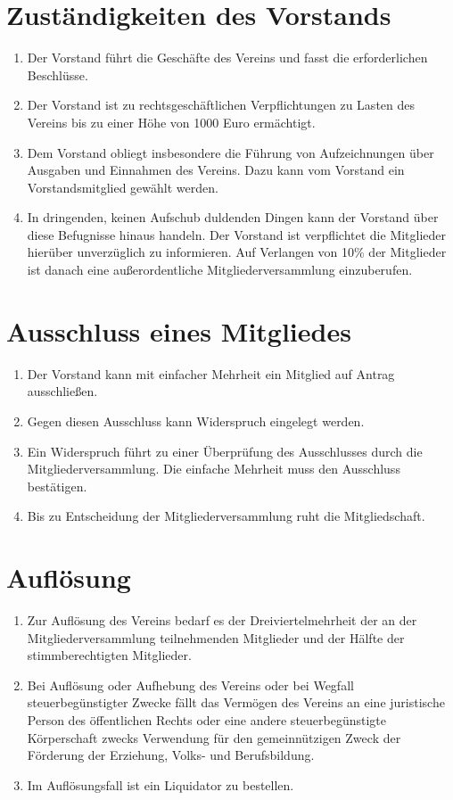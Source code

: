 \documentclass[ngerman]{article}
\begin{document}
\section{Zuständigkeiten des Vorstands}
\begin{enumerate}
\item Der Vorstand führt die Geschäfte des Vereins und fasst die erforderlichen Beschlüsse.
\item Der Vorstand ist zu rechtsgeschäftlichen Verpflichtungen zu Lasten des Vereins bis zu einer Höhe von 1000 Euro ermächtigt.
\item Dem Vorstand obliegt insbesondere die Führung von Aufzeichnungen über Ausgaben und Einnahmen des Vereins. Dazu kann vom Vorstand ein Vorstandsmitglied gewählt werden.
\item In dringenden, keinen Aufschub duldenden Dingen kann der Vorstand über diese Befugnisse hinaus handeln. Der Vorstand ist verpflichtet
die Mitglieder hierüber unverzüglich zu informieren. Auf Verlangen von 10\% der Mitglieder ist danach eine außerordentliche Mitgliederversammlung einzuberufen.
\end{enumerate}

\section{Ausschluss eines Mitgliedes}
\begin{enumerate}
\item Der Vorstand kann mit einfacher Mehrheit ein Mitglied auf Antrag ausschließen.
\item Gegen diesen Ausschluss kann Widerspruch eingelegt werden.
\item Ein Widerspruch führt zu einer Überprüfung des Ausschlusses durch die Mitgliederversammlung. Die einfache Mehrheit muss den Ausschluss
bestätigen.
\item Bis zu Entscheidung der Mitgliederversammlung ruht die Mitgliedschaft.
\end{enumerate}

\section{Auflösung}
\begin{enumerate}
\item Zur Auflösung des Vereins bedarf es der Dreiviertelmehrheit der an der Mitgliederversammlung teilnehmenden Mitglieder und der Hälfte
der stimmberechtigten Mitglieder.
\item Bei Auflösung oder Aufhebung des Vereins oder bei Wegfall steuerbegünstigter Zwecke fällt das Vermögen des Vereins an eine juristische Person des öffentlichen Rechts oder eine andere steuerbegünstigte Körperschaft zwecks Verwendung für den gemeinnützigen Zweck der Förderung der Erziehung, Volks- und Berufsbildung.
\item Im Auflösungsfall ist ein Liquidator zu bestellen.
\end{enumerate}
\end{document}
